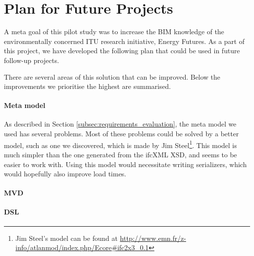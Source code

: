 \section{Plan for Future Projects}
\label{sec:plan_for_future_projects}
A meta goal of this pilot study was to increase the BIM knowledge of the environmentally concerned ITU research initiative, Energy Futures. As a part of this project, we have developed the following plan that could be used in future follow-up projects.

There are several areas of this solution that can be improved. Below the improvements we prioritise the highest are summarised.
\paragraph{Meta model}
As described in Section \ref{subsec:requirements_evaluation}, the meta model we used has several problems. Most of these problems could be solved by a better model, such as one we discovered, which is made by Jim Steel\footnote{Jim Steel's model can be found at \url{http://www.emn.fr/z-info/atlanmod/index.php/Ecore#ifc2x3_0.1}}. This model is much simpler than the one generated from the ifcXML XSD, and seems to be easier to work with. Using this model would necessitate writing serializers, which would hopefully also improve load times.
\paragraph{MVD}
\paragraph{DSL}


